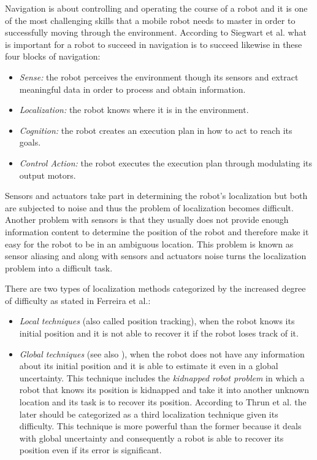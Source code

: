 Navigation is about controlling and operating the course of a robot and it is one of the most challenging skills that a mobile robot needs to master in order to successfully moving through the environment. According to Siegwart et al. what is important for a robot to succeed in navigation is to succeed likewise in these four blocks of navigation:

\begin{itemize}
\item \textit{Sense:} the robot perceives the environment though its sensors and extract meaningful data in order to process and obtain information.
\item \textit{Localization:} the robot knows where it is in the environment.
\item \textit{Cognition:} the robot creates an execution plan in how to act to reach its goals.
\item \textit{Control Action:} the robot executes the execution plan through modulating its output motors.
\end{itemize}

Sensors and actuators take part in determining the robot's localization but both are subjected to noise and thus the problem of localization becomes difficult. Another problem with sensors is that they usually does not provide enough information content to determine the position of the robot and therefore make it easy for the robot to be in an ambiguous location. This problem is known as sensor aliasing and along with sensors and actuators noise turns the localization problem into a difficult task\cite{Siegwart:intro-autonumous-robots}.

There are two types of localization methods categorized by the increased degree of difficulty as stated in Ferreira et al.\cite{Ferreira:prob}: 

\begin{itemize}
\item \textit{Local techniques} (also called position tracking\cite{Thrun:2005:PR:1121596}), when the robot knows its initial position and it is not able to recover it if the robot loses track of it.
\item \textit{Global techniques} (see also \cite{Feng:where-am-I}), when the robot does not have any information about its initial position and it is able to estimate it even in a global uncertainty. This technique includes the \textit{kidnapped robot problem} in which a robot that knows its position is kidnapped and take it into another unknown location and its task is to recover its position. According to Thrun et al.\cite{Thrun:2005:PR:1121596} the later should be categorized as a third localization technique given its difficulty. This technique is more powerful than the former because it deals with global uncertainty and consequently a robot is able to recover its position even if its error is significant.
\end{itemize}

